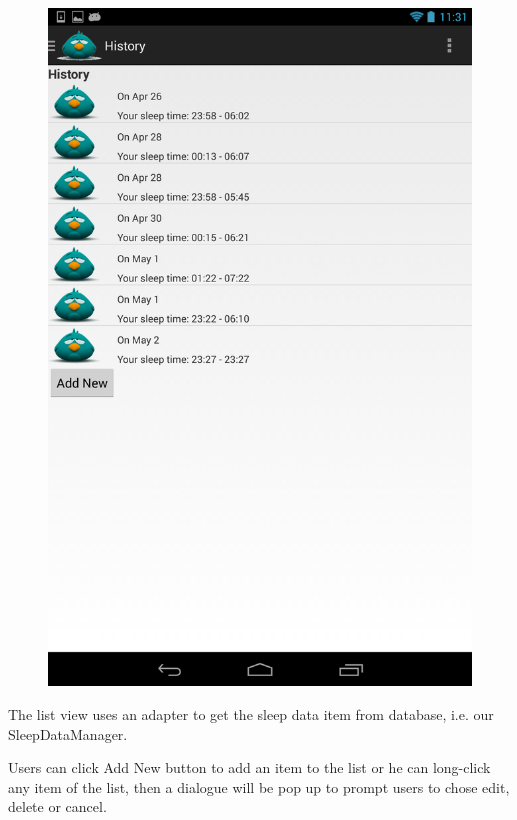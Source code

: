 \documentclass[14pt]{extreport}
\begin{document}
\begin{figure}[h]
\begin{center}
\includegraphics[width=5in]{history}
\end{center}
\end{figure}


The list view uses an adapter to get the sleep data item from database, i.e. our SleepDataManager.

Users can click Add New button to add an item to the list or he can long-click any item of the list, then a dialogue will be pop up to prompt users to chose edit, delete or cancel. 
\end{document}
